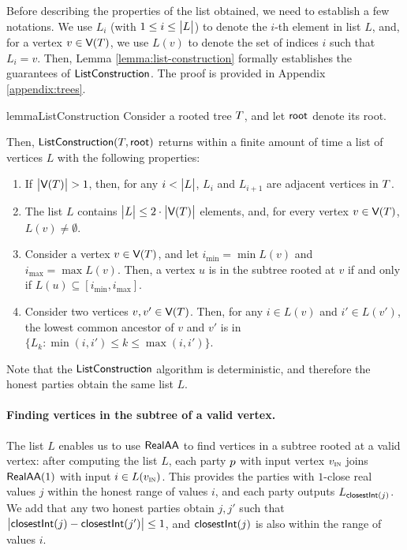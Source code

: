 Before describing the properties of the list obtained, we need to establish a few notations.
We use $L_i$ (with $1 \leq i \leq \big\lvert L\big\rvert$) to denote the $i$-th element in list $L$, and, for a vertex $v \in \textsf{V}(T)$, we use $L(v)$ to denote the set of indices $i$ such that $L_i = v$. Then, Lemma \ref{lemma:list-construction} formally establishes the guarantees of $\textsf{ListConstruction}$. The proof is provided in Appendix \ref{appendix:trees}.

\begin{restatable}{lemma}{ListConstruction} \label{lemma:list-construction}
    Consider a rooted tree $T$, and let $\textsf{root}$ denote its root.
    
    Then, $\textsf{ListConstruction}(T, \textsf{root})$ returns within a finite amount of time a list of vertices $L$ with the following properties:
    \begin{enumerate}[nosep]
        \item If $\big\lvert\textsf{V}(T)\big\rvert > 1$, then, for any $i < \big\lvert L\big\rvert$, $L_i$ and $L_{i+1}$ are adjacent vertices in $T$.
        \item The list $L$ contains $\big\lvert L\big\rvert \leq 2 \cdot \big\lvert\textsf{V}(T)\big\rvert$ elements, and, for every vertex $v \in \textsf{V}(T)$, $L(v) \neq \emptyset$. 
        \item Consider a vertex $v \in \textsf{V}(T)$, and let $i_{\min} = \min L(v)$ and $i_{\max} = \max L(v)$. Then, a vertex $u$ is in the subtree rooted at $v$ if and only if $L(u) \subseteq [i_{\min}, i_{\max}]$.
        \item Consider two vertices $v, v' \in \textsf{V}(T)$. Then, for any $i \in L(v)$ and $i' \in L(v')$, the lowest common ancestor of $v$ and $v'$ is in $\{L_k : \min(i, i') \leq k \leq \max(i, i')\}$.
    \end{enumerate}
\end{restatable}

Note that the $\textsf{ListConstruction}$ algorithm is deterministic, and therefore the honest parties obtain the same list $L$.

\paragraph{Finding vertices in the subtree of a valid vertex.}
The list $L$ enables us to use $\textsf{RealAA}$ to find vertices in a subtree rooted at a valid vertex: after computing the list $L$, 
each party $p$ with input vertex $v_{\textsc{in}}$ joins $\textsf{RealAA}(1)$ with input $i \in L(v_{\textsc{in}})$.
This provides the parties with $1$-close real values $j$ within the honest range of values $i$, and each party outputs $L_{\textsf{closestInt}(j)}$. 
We add that any two honest parties obtain $j, j'$ such that $\big\lvert\textsf{closestInt}(j) - \textsf{closestInt}(j')\big\rvert \leq 1$, and $\textsf{closestInt}(j)$ is also within the range of values $i$. 

